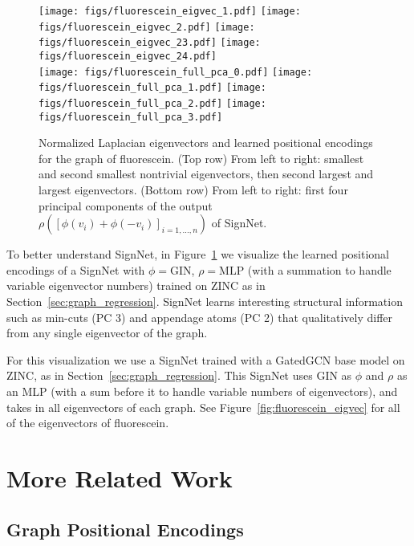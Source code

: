 \documentclass{article} \usepackage{iclr2023_conference,times}
\begin{document}
\begin{figure}[ht]
    \newcommand{\wth}{.24}
    \hspace{2.2pt}\texttt{[image: figs/fluorescein\_eigvec\_1.pdf]}
    \texttt{[image: figs/fluorescein\_eigvec\_2.pdf]}
    \texttt{[image: figs/fluorescein\_eigvec\_23.pdf]}
    \texttt{[image: figs/fluorescein\_eigvec\_24.pdf]}\\[10pt]
    \texttt{[image: figs/fluorescein\_full\_pca\_0.pdf]}
    \texttt{[image: figs/fluorescein\_full\_pca\_1.pdf]}
    \texttt{[image: figs/fluorescein\_full\_pca\_2.pdf]}
    \hspace{2.1pt}\texttt{[image: figs/fluorescein\_full\_pca\_3.pdf]}
    \caption{Normalized Laplacian eigenvectors and learned positional encodings for the graph of  fluorescein. (Top row) From left to right: smallest and second smallest nontrivial eigenvectors, then second largest and largest eigenvectors. (Bottom row) From left to right: first four principal components of the output $\rho([\phi(v_i) + \phi(-v_i)]_{i=1,\ldots, n})$ of SignNet. 
    }
    \label{fig:visualize_molecule}
\end{figure}

To better understand SignNet, in Figure~\ref{fig:visualize_molecule} we visualize the learned positional encodings of a SignNet with $\phi=\text{GIN}$, $\rho=\text{MLP}$ (with a summation to handle variable eigenvector numbers)  trained on ZINC as in Section~\ref{sec:graph_regression}.
 SignNet learns interesting structural information such as min-cuts (PC 3) and appendage atoms (PC 2) that qualitatively differ from any single eigenvector of the graph. 

For this visualization we use a SignNet trained with a GatedGCN base model on ZINC, as in Section~\ref{sec:graph_regression}. This SignNet uses GIN as $\phi$ and $\rho$ as an MLP (with a sum before it to handle variable numbers of eigenvectors), and takes in all eigenvectors of each graph. See Figure~\ref{fig:fluorescein_eigvec} for all of the eigenvectors of fluorescein.


\section{More Related Work}\label{appendix:more_related}

\subsection{Graph Positional Encodings}
\end{document}
